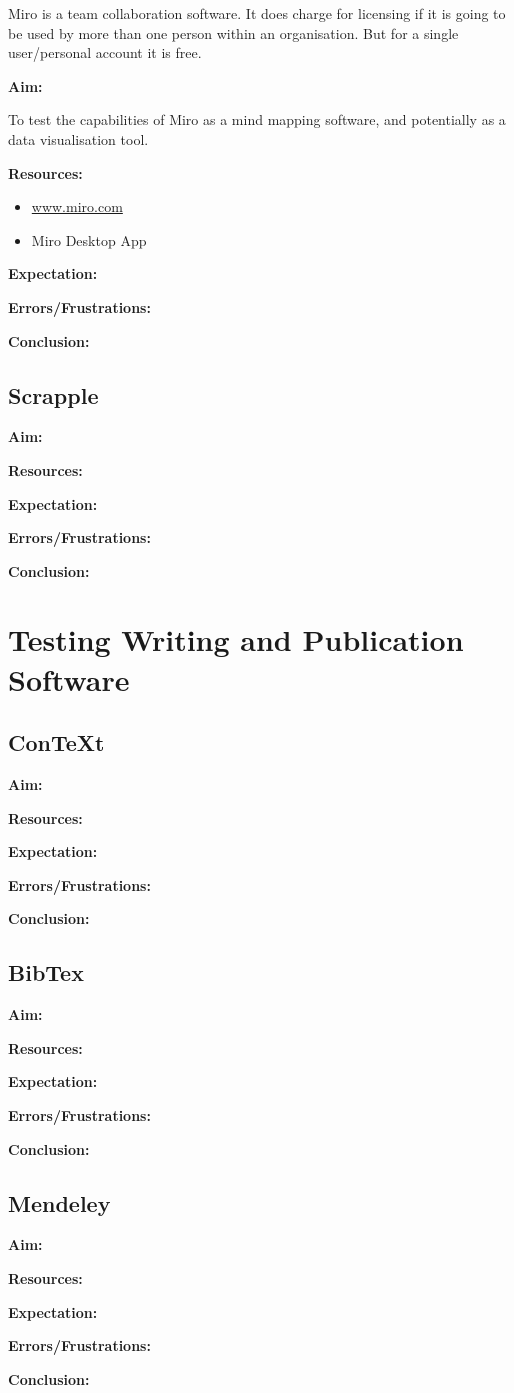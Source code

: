 \documentclass{article}
\begin{document}
Miro is a team collaboration software. 
It does charge for licensing if it is going to be used by more than one person within an organisation. But for a single user/personal account it is free.

\textbf{Aim:}

To test the capabilities of Miro as a mind mapping software, and potentially as a data visualisation tool.

\textbf{Resources:}
\begin{itemize}
    \item \url{www.miro.com}
    \item Miro Desktop App
\end{itemize}
\textbf{Expectation:}

\label{Error: Miro Errors/Frustrations}
\textbf{Errors/Frustrations:}

\textbf{Conclusion:}

\subsection{Scrapple}
\textbf{Aim:}

\textbf{Resources:}

\textbf{Expectation:}

\label{Error: Scrapple Errors/Frustrations}
\textbf{Errors/Frustrations:}

\textbf{Conclusion:}
\section{Testing Writing and Publication Software}


\subsection{ConTeXt}

\textbf{Aim:}

\textbf{Resources:}

\textbf{Expectation:}

\label{Error: ConTeXt Errors/Frustrations}
\textbf{Errors/Frustrations:}

\textbf{Conclusion:}

\subsection{BibTex}

\textbf{Aim:}

\textbf{Resources:}

\textbf{Expectation:}

\label{Error: BibTex Errors/Frustrations}
\textbf{Errors/Frustrations:}

\textbf{Conclusion:}

\subsection{Mendeley}

\textbf{Aim:}

\textbf{Resources:}

\textbf{Expectation:}

\label{Error: Mendeley Errors/Frustrations}
\textbf{Errors/Frustrations:}

\textbf{Conclusion:}
\end{document}
